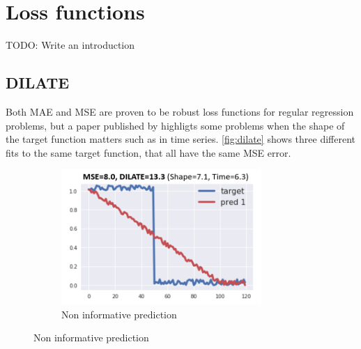 
\section{Loss functions}
TODO: Write an introduction
\subsection{ DILATE }

Both MAE and MSE are proven to be robust loss functions for regular regression problems,
but a paper published by \citeauthor{Guen2019} highligts some problems when the shape of the target function matters
such as in time series.
\autoref{fig:dilate} shows three different fits to the same target function, that all have
the same MSE error.

\begin{figure}[h!]
  \centering
  \begin{subfigure}[b]{0.3\textwidth}
    \centering
    \caption{Non informative prediction}
    \label{fig:dilate-non-informative}
    \includegraphics[width=\textwidth]{./figs/illustrations/dilate_ex1.png}
    \hfill
  \end{subfigure}


\end{figure}
